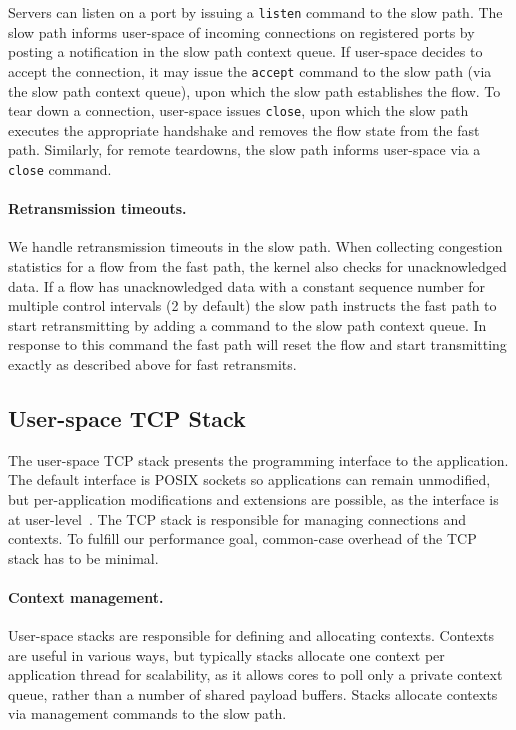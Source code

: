 Servers can listen on a port by issuing a \verb+listen+ command to the
slow path. The slow path informs user-space of incoming connections on
registered ports by posting a notification in the slow path context
queue. If user-space decides to accept the connection, it may issue
the \verb+accept+ command to the slow path (via the slow path context
queue), upon which the slow path establishes the flow. To tear down a
connection, user-space issues \verb+close+, upon which the slow path
executes the appropriate handshake and removes the flow state from the
fast path. Similarly, for remote teardowns, the slow path informs
user-space via a \verb+close+ command.

\paragraph{Retransmission timeouts.} We handle retransmission timeouts
in the slow path. When collecting congestion statistics for a flow
from the fast path, the kernel also checks for unacknowledged
data. %
If a flow has unacknowledged data with a constant sequence number for
multiple control intervals (2 by default) the slow path instructs the
fast path to start retransmitting by adding a command to the slow path
context queue.  In response to this command the fast path will reset
the flow and start transmitting exactly as described above for fast
retransmits.

\subsection{User-space TCP Stack}\label{sec:app_design}

The user-space TCP stack presents the programming interface to the
application. The default interface is POSIX sockets so applications
can remain unmodified, but per-application modifications and
extensions are possible, as the interface is at
user-level~\cite{peter:arrakis,sandstorm,belay:ix}. The TCP stack is
responsible for managing connections and contexts. To fulfill our
performance goal, common-case overhead of the TCP stack has to be
minimal.

\paragraph{Context management.} User-space stacks are responsible for
defining and allocating contexts. Contexts are useful in various ways,
but typically stacks allocate one context per application thread for
scalability, as it allows cores to poll only a private context queue,
rather than a number of shared payload buffers.
Stacks allocate contexts via management commands to the slow path.

